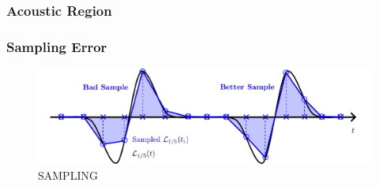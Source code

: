 \subsubsection{Acoustic Region}






\subsubsection{Sampling Error}

\begin{figure}[t]
\centering
\includegraphics[scale=0.65]{assets/imgs/wave-sampling-comparison.pdf}
\caption{SAMPLING}
\label{fig:wave-sampling}
\end{figure}


